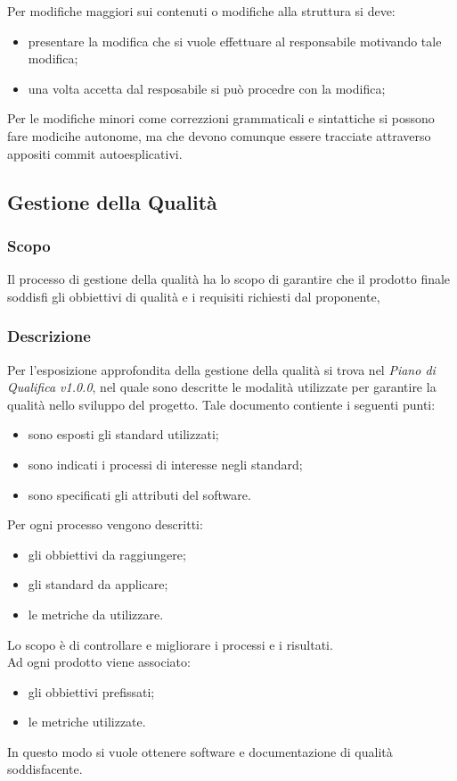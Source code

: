         Per modifiche maggiori sui contenuti o modifiche alla struttura si deve:
        \begin{itemize}
            \item presentare la modifica che si vuole effettuare al responsabile motivando tale modifica;
            \item una volta accetta dal resposabile si può procedre con la modifica; 
        \end{itemize} 
        Per le modifiche minori come correzzioni grammaticali e sintattiche si possono fare modicihe autonome, ma che devono comunque essere tracciate attraverso appositi commit autoesplicativi.
    \subsection{Gestione della Qualità}
        \subsubsection{Scopo}
        Il processo di gestione della qualità ha lo scopo di garantire che il prodotto finale soddisfi gli obbiettivi di qualità e i requisiti richiesti dal proponente,  %
        \subsubsection{Descrizione}
        Per l'esposizione approfondita della gestione della qualità si trova nel \emph{Piano di Qualifica v1.0.0}, nel quale sono descritte le modalità utilizzate per garantire la qualità nello sviluppo del progetto. Tale documento contiente i seguenti punti:
        \begin{itemize}
            \item sono esposti gli standard utilizzati;
            \item sono indicati i processi di interesse negli standard;
            \item sono specificati gli attributi del software.
        \end{itemize}
        Per ogni processo vengono descritti:
        \begin{itemize}
            \item gli obbiettivi da raggiungere;
            \item gli standard da applicare;
            \item le metriche da utilizzare.
        \end{itemize}
        Lo scopo è di controllare e migliorare i processi e i risultati. \\
        Ad ogni prodotto viene associato:
        \begin{itemize}
            \item gli obbiettivi prefissati;
            \item le metriche utilizzate.
        \end{itemize} 
        In questo modo si vuole ottenere software e documentazione di qualità soddisfacente.
